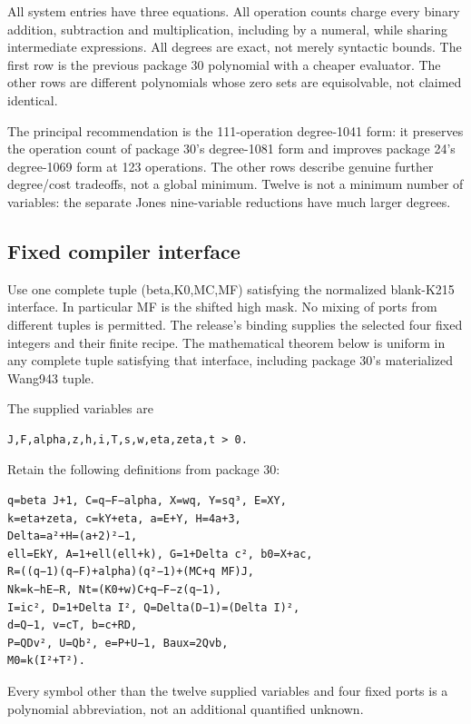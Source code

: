 \documentclass[
  10pt,
]{article}
\begin{document}
All system entries have three equations. All operation counts charge
every binary addition, subtraction and multiplication, including by a
numeral, while sharing intermediate expressions. All degrees are exact,
not merely syntactic bounds. The first row is the previous package 30
polynomial with a cheaper evaluator. The other rows are different
polynomials whose zero sets are equisolvable, not claimed identical.

The principal recommendation is the 111-operation degree-1041 form: it
preserves the operation count of package 30's degree-1081 form and
improves package 24's degree-1069 form at 123 operations. The other rows
describe genuine further degree/cost tradeoffs, not a global minimum.
Twelve is not a minimum number of variables: the separate Jones
nine-variable reductions have much larger degrees.

\subsection{Fixed compiler interface}\label{fixed-compiler-interface}

Use one complete tuple (beta,K0,MC,MF) satisfying the normalized
blank-K215 interface. In particular MF is the shifted high mask. No
mixing of ports from different tuples is permitted. The release's
binding supplies the selected four fixed integers and their finite
recipe. The mathematical theorem below is uniform in any complete tuple
satisfying that interface, including package 30's materialized Wang943
tuple.

The supplied variables are

\begin{verbatim}
J,F,alpha,z,h,i,T,s,w,eta,zeta,t > 0.
\end{verbatim}

Retain the following definitions from package 30:

\begin{verbatim}
q=beta J+1, C=q−F−alpha, X=wq, Y=sq³, E=XY,
k=eta+zeta, c=kY+eta, a=E+Y, H=4a+3,
Delta=a²+H=(a+2)²−1,
ell=EkY, A=1+ell(ell+k), G=1+Delta c², b0=X+ac,
R=((q−1)(q−F)+alpha)(q²−1)+(MC+q MF)J,
Nk=k−hE−R, Nt=(K0+w)C+q−F−z(q−1),
I=ic², D=1+Delta I², Q=Delta(D−1)=(Delta I)²,
d=Q−1, v=cT, b=c+RD,
P=QDv², U=Qb², e=P+U−1, Baux=2Qvb,
M0=k(I²+T²).
\end{verbatim}

Every symbol other than the twelve supplied variables and four fixed
ports is a polynomial abbreviation, not an additional quantified
unknown.
\end{document}
